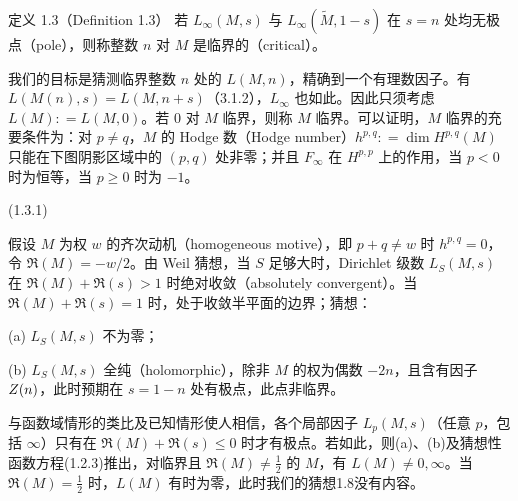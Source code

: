 \begin{originaltheorem}{定义 1.3（Definition 1.3）}
若 $L_\infty(M,s)$ 与 $L_\infty(\widetilde M,1-s)$ 在 $s=n$ 处均无极点（pole），则称整数 $n$ 对 $M$ 是临界的（critical）。
\end{originaltheorem}

我们的目标是猜测临界整数 $n$ 处的 $L(M,n)$，精确到一个有理数因子。有 $L(M(n),s)=L(M,n+s)$（3.1.2），$L_\infty$ 也如此。因此只须考虑 $L(M)\mathrel{\mathop:}=L(M,0)$。若 $0$ 对 $M$ 临界，则称 $M$ 临界。可以证明，$M$ 临界的充要条件为：对 $p\ne q$，$M$ 的 Hodge 数（Hodge number）$h^{p,q}\mathrel{\mathop:}=\dim H^{p,q}(M)$ 只能在下图阴影区域中的 $(p,q)$ 处非零；并且 $F_\infty$ 在 $H^{p,p}$ 上的作用，当 $p<0$ 时为恒等，当 $p\geq0$ 时为 $-1$。

\begin{center}
\qquad(1.3.1)
\end{center}

假设 $M$ 为权 $w$ 的齐次动机（homogeneous motive），即 $p+q\ne w$ 时 $h^{p,q}=0$，令 $\mathfrak R(M)=-w/2$。由 Weil 猜想，当 $S$ 足够大时，Dirichlet 级数 $L_S(M,s)$ 在 $\mathfrak R(M)+\Re(s)>1$ 时绝对收敛（absolutely convergent）。当 $\mathfrak R(M)+\Re(s)=1$ 时，处于收敛半平面的边界；猜想：

(a) $L_S(M,s)$ 不为零；

(b) $L_S(M,s)$ 全纯（holomorphic），除非 $M$ 的权为偶数 $-2n$，且含有因子 $Z(n)$，此时预期在 $s=1-n$ 处有极点，此点非临界。

与函数域情形的类比及已知情形使人相信，各个局部因子 $L_p(M,s)$（任意 $p$，包括 $\infty$）只有在 $\mathfrak R(M)+\Re(s)\leq0$ 时才有极点。若如此，则(a)、(b)及猜想性函数方程(1.2.3)推出，对临界且 $\mathfrak R(M)\ne\tfrac12$ 的 $M$，有 $L(M)\ne0,\infty$。当 $\mathfrak R(M)=\tfrac12$ 时，$L(M)$ 有时为零，此时我们的猜想1.8没有内容。

